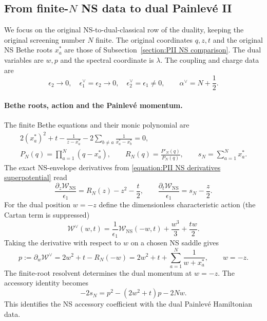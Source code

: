 \documentclass[a4paper,11pt]{article}
\numberwithin{equation}{section}
\begin{document}
\subsection{From finite-\texorpdfstring{$N$}{N} NS data to dual Painlev\'e II}
\label{subsection:PII Langlands limiting opers}

We focus on the original NS-to-dual-classical row of the duality,
keeping the original screening number $N$ finite.  The original
coordinates $q,z,t$ and the original NS Bethe roots $x_a^*$ are those
of Subsection~\ref{section:PII NS comparison}.  The dual variables are $w,p$ and the spectral coordinate is
$\lambda$.  The coupling and charge data are
\begin{equation}
	\label{equation:PII Langlands NS to dual charge}
	\epsilon_2\to0,\quad \epsilon_1^{\vee}=\epsilon_2\to0,
	\quad\epsilon_2^{\vee}=\epsilon_1\ne0,\qquad
	\alpha^{\vee}=N+\frac12.
\end{equation}
\paragraph*{Bethe roots, action and the Painlev\'e momentum.}
The finite Bethe equations and their monic polynomial are
\begin{equation}
	\label{equation:PII Langlands Bethe regularity in PII}
	\begin{gathered}
		2(x_a^*)^2+t-\frac{1}{z-x_a^*}
		-2\sum_{b\ne a}\frac{1}{x_a^*-x_b^*}=0,\\
		P_N(q)=\prod_{a=1}^N(q-x_a^*),\qquad
		R_N(q)=\frac{P'_N(q)}{P_N(q)},\qquad
		s_N=\sum_{a=1}^Nx_a^*.
	\end{gathered}
\end{equation}
The exact NS-envelope derivatives from
\eqref{equation:PII NS derivatives superpotential} read
\begin{equation}
	\label{equation:PII Langlands NS finite action derivatives}
	\frac{\partial_z\mathcal W_{\mathrm{NS}}}{\epsilon_1}
	=R_N(z)-z^2-\frac t2,\qquad
	\frac{\partial_t\mathcal W_{\mathrm{NS}}}{\epsilon_1}
	=s_N-\frac z2.
\end{equation}
For the dual position $w=-z$ define the dimensionless characteristic
action (the Cartan term is suppressed)
\begin{equation}
	\label{equation:PII Langlands limiting action exchange inverse}
	\mathcal W^{\vee}(w,t)
	=\frac{1}{\epsilon_1}\mathcal W_{\mathrm{NS}}(-w,t)
	+\frac{w^3}{3}+\frac{tw}{2}.
\end{equation}
Taking the derivative with respect to $w$ on a chosen NS saddle gives
\begin{equation}
	\label{equation:PII Langlands special oper identification}
	p:=\partial_w\mathcal W^{\vee}
	=2w^2+t-R_N(-w)
	=2w^2+t+\sum_{a=1}^N\frac{1}{w+x_a^*},
	\qquad w=-z.
\end{equation}
The finite-root resolvent determines the dual momentum at $w=-z$.
The accessory identity becomes
\begin{equation}
	\label{equation:PII Langlands special accessory identity}
	-2s_N=p^2-(2w^2+t)p-2Nw.
\end{equation}
This identifies the NS accessory coefficient with the dual Painlev\'e
Hamiltonian data.
\end{document}

